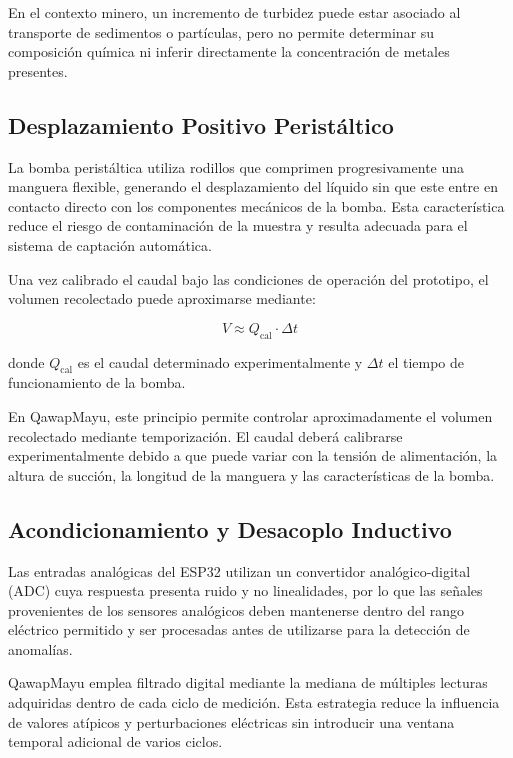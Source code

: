 \documentclass[11pt,a4paper]{article}
\begin{document}
En el contexto minero, un incremento de turbidez puede estar asociado al transporte de sedimentos o partículas, pero no permite determinar su composición química ni inferir directamente la concentración de metales presentes.

\subsection{Desplazamiento Positivo Peristáltico}

La bomba peristáltica utiliza rodillos que comprimen progresivamente una manguera flexible, generando el desplazamiento del líquido sin que este entre en contacto directo con los componentes mecánicos de la bomba. Esta característica reduce el riesgo de contaminación de la muestra y resulta adecuada para el sistema de captación automática.

Una vez calibrado el caudal bajo las condiciones de operación del prototipo, el volumen recolectado puede aproximarse mediante:

\begin{equation}
    V \approx Q_{\text{cal}} \cdot \Delta t
\end{equation}

donde $Q_{\text{cal}}$ es el caudal determinado experimentalmente y $\Delta t$ el tiempo de funcionamiento de la bomba.

En QawapMayu, este principio permite controlar aproximadamente el volumen recolectado mediante temporización. El caudal deberá calibrarse experimentalmente debido a que puede variar con la tensión de alimentación, la altura de succión, la longitud de la manguera y las características de la bomba.

\subsection{Acondicionamiento y Desacoplo Inductivo}

Las entradas analógicas del ESP32 \cite{esp32} utilizan un convertidor analógico-digital (ADC) cuya respuesta presenta ruido y no linealidades, por lo que las señales provenientes de los sensores analógicos deben mantenerse dentro del rango eléctrico permitido y ser procesadas antes de utilizarse para la detección de anomalías.

QawapMayu emplea filtrado digital mediante la mediana de múltiples lecturas adquiridas dentro de cada ciclo de medición. Esta estrategia reduce la influencia de valores atípicos y perturbaciones eléctricas sin introducir una ventana temporal adicional de varios ciclos.
\end{document}
